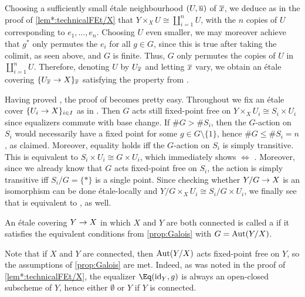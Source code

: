 \begin{proof*}
	Choosing a sufficiently small étale neighbourhood $(U,\ov{u})$ of $\ov{x}$, we deduce as in the proof of \cref{lem*:technicalFEt/X} that $Y\times_XU\cong \coprod_{i=1}^n U$, with the $n$ copies of $U$ corresponding to $e_1,\dotsc,e_n$. Choosing $U$ even smaller, we may moreover achieve that $g^*$ only permutes the $e_i$ for all $g\in G$, since this is true after taking the colimit, as seen above, and $G$ is finite. Thus, $G$ only permutes the copies of $U$ in $\coprod_{i=1}^nU$. Therefore, denoting $U$ by $U_{\ov{x}}$ and letting $\ov{x}$ vary, we obtain an étale covering $\{U_{\ov{x}}\morphism X\}_{\ov{x}}$ satisfying the property from \itememph{*}.
	
	Having proved \itememph{*}, the proof of  becomes pretty easy. Throughout we fix an étale cover $\{U_i\morphism X\}_{i\in I}$ as in \itememph{*}. Then $G$ acts still fixed-point free on $Y\times_XU_i\cong S_i\times U_i$ since equalizers commute with base change. If $\#G>\#S_i$, then the $G$-action on $S_i$ would necessarily have a fixed point for some $g\in G\setminus\{1\}$, hence $\# G\leq \#S_i=n$, as claimed. Moreover, equality holds iff the $G$-action on $S_i$ is simply transitive. This is equivalent to $S_i\times U_i\cong G\times U_i$, which immediately shows  $\Leftrightarrow$ . Moreover, since we already know that $G$ acts fixed-point free on $S_i$, the action is simply transitive iff $S_i/G=\{*\}$ is a single point. Since checking whether $Y/G\morphism X$ is an isomorphism can be done étale-locally and $Y/G\times_XU_i\cong S_i/G\times U_i$, we finally see that  is equivalent to ,  as well.
\end{proof*}
\begin{defi}\label{def:Galois}
	An étale covering $Y\morphism X$ in which $X$ and $Y$ are both connected is called a  if it satisfies the equivalent conditions from \cref{prop:Galois} with $G=\operatorname{Aut}(Y/X)$.
\end{defi}
\begin{rem*}
	Note that if $X$ and $Y$ are connected, then $\operatorname{Aut}(Y/X)$ acts fixed-point free on $Y$, so the assumptions of \cref{prop:Galois} are met. Indeed, as was noted in the proof of \cref{lem*:technicalFEt/X}, the equalizer $\Eq(\id_Y,g)$ is always an open-closed subscheme of $Y$, hence either $\emptyset$ or $Y$ if $Y$ is connected.
\end{rem*}
